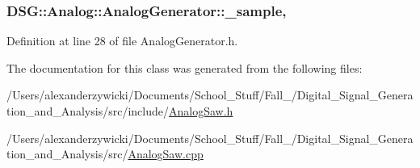 \hypertarget{classDSG_1_1Analog_1_1AnalogGenerator_af20b26cee2cd03dfdb3d845f527b2f1c}{
\subsubsection[{\-\_\-sample}]{ D\-S\-G\-::\-Analog\-::\-Analog\-Generator\-::\-\_\-sample\hspace{0.3cm}{\ttfamily [protected]}, {\ttfamily [inherited]}}}\label{classDSG_1_1Analog_1_1AnalogGenerator_af20b26cee2cd03dfdb3d845f527b2f1c}


Definition at line 28 of file Analog\-Generator.\-h.



The documentation for this class was generated from the following files\-:\begin{DoxyCompactItemize}
\item 
/\-Users/alexanderzywicki/\-Documents/\-School\-\_\-\-Stuff/\-Fall\-\_/\-Digital\-\_\-\-Signal\-\_\-\-Generation\-\_\-and\-\_\-\-Analysis/src/include/\hyperlink{AnalogSaw_8h}{Analog\-Saw.\-h}\item 
/\-Users/alexanderzywicki/\-Documents/\-School\-\_\-\-Stuff/\-Fall\-\_/\-Digital\-\_\-\-Signal\-\_\-\-Generation\-\_\-and\-\_\-\-Analysis/src/\hyperlink{AnalogSaw_8cpp}{Analog\-Saw.\-cpp}\end{DoxyCompactItemize}
